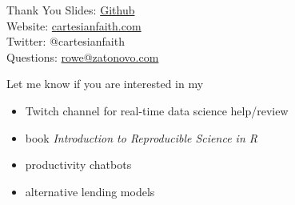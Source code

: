 \documentclass{beamer}
\begin{document}
\begin{frame}{Thank You}
Slides: \href{https://github.com/muxspace/sdss_2020}{Github}\\
Website: \href{https://cartesianfaith.com}{cartesianfaith.com}\\
Twitter: @cartesianfaith\\
Questions: \href{mailto:rowe@zatonovo.com}{rowe@zatonovo.com}

Let me know if you are interested in my

\begin{itemize}
\item Twitch channel for real-time data science help/review
\item book \emph{Introduction to Reproducible Science in R}
\item productivity chatbots
\item alternative lending models
\end{itemize}
\end{frame}

%
%
\end{document}
